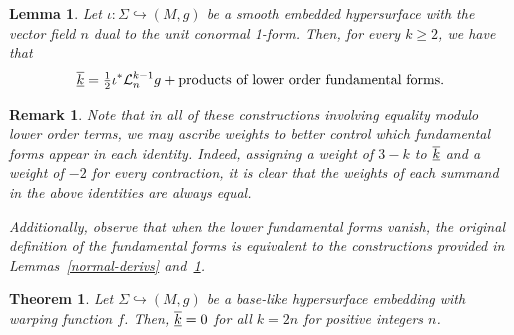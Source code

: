 \documentclass[10pt,a4paper]{amsart}
\newtheorem{lemma}{Lemma}
\newtheorem{remark}{Remark}
\newtheorem{theorem}{Theorem}
\newcommand{\FF}[1]{\underline{\overline{\rm{#1}}}}
\renewcommand\geq{\geqslant}
\begin{document}
\begin{lemma} \label{lie-derivs}
Let $\iota : \Sigma \hookrightarrow (M,g)$ be a smooth embedded hypersurface with the vector field $n$ dual to 
the unit conormal 1-form. Then, for every $k \geq 2$, we have that
$$\FF{k} = \tfrac{1}{2} \iota^* \mathcal{L}_n^{k-1} g+ \text{products of lower order fundamental forms.}$$
\end{lemma}

\begin{remark}\label{weights}
Note that in all of these constructions involving equality modulo lower order terms, we may ascribe weights to better control which fundamental forms appear in each identity. Indeed, assigning a weight of $3-k$ to $\FF{k}$ and a weight of $-2$ for every contraction, it is clear that the weights of each summand in the above identities are always equal.

Additionally, observe that when the lower fundamental forms vanish, the original definition of the fundamental forms is equivalent to the constructions provided in Lemmas~\ref{normal-derivs} and~\ref{lie-derivs}.
\end{remark}

\begin{theorem} \label{vanishing-evens}
Let $\Sigma \hookrightarrow (M,g)$ be a base-like hypersurface embedding with warping function $f$. Then, $\FF{k} = 0$ for all $k = 2n$ for positive integers $n$.
\end{theorem}
\end{document}
